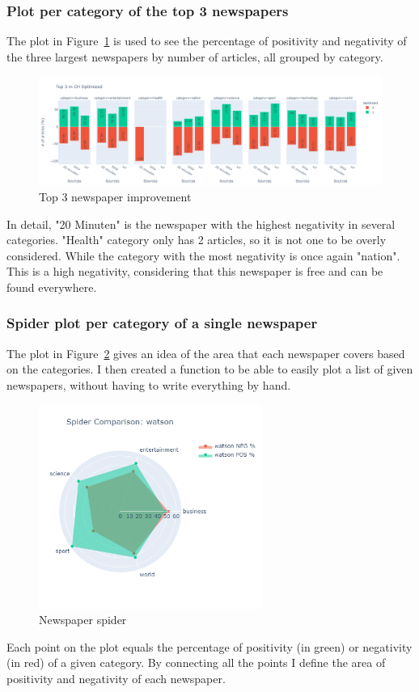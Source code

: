 \subsubsection{Plot per category of the top 3 newspapers}
The \gls{plot} in Figure~\ref{fig:fig_improvement} is used to see the percentage of positivity and negativity of the three largest newspapers by number of articles, all grouped by category.

\begin{figure}[H]
 \includegraphics[width=1.25\textwidth,center]{images/top32.png}
\caption{Top 3 newspaper improvement}
\label{fig:fig_improvement}
\end{figure}

In detail, "20 Minuten" is the newspaper with the highest negativity in several categories.
"Health" category only has 2 articles, so it is not one to be overly considered.
While the category with the most negativity is once again "nation".
This is a high negativity, considering that this newspaper is free and can be found everywhere.

\subsubsection{Spider plot per category of a single newspaper} 
The \gls{plot} in Figure~\ref{fig:fig_spider} gives an idea of the area that each newspaper covers based on the categories. I then created a function to be able to easily \gls{plot} a list of given newspapers, without having to write everything by hand.

\begin{figure}[H]
\centering
\includegraphics[width=0.65\textwidth]{images/wats.png}
\caption{Newspaper spider}
\label{fig:fig_spider}
\end{figure}
\FloatBarrier
Each point on the \gls{plot} equals the percentage of positivity (in green) or negativity (in red) of a given category. By connecting all the points I define the area of positivity and negativity of each newspaper.

